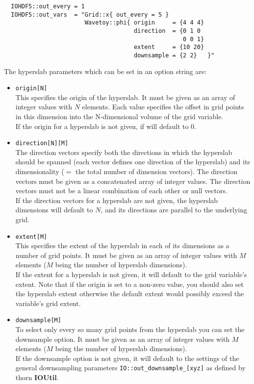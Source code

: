 \documentclass{article}
\begin{document}
\begin{verbatim}
  IOHDF5::out_every = 1
  IOHDF5::out_vars  = "Grid::x{ out_every = 5 }
                       Wavetoy::phi{ origin     = {4 4 4}
                                     direction  = {0 1 0
                                                   0 0 1}
                                     extent     = {10 20}
                                     downsample = {2 2}   }"
\end{verbatim}

The hyperslab parameters which can be set in an option string are:
\begin{itemize}
  \item{\tt origin[N]}\\
    This specifies the origin of the hyperslab. It must be given as an array
    of integer values with $N$ elements. Each value specifies the offset in
    grid points in this dimension into the N-dimensional volume of the grid
    variable.\\
    If the origin for a hyperslab is not given, if will default to 0.
  \item{\tt direction[N][M]}\\
    The direction vectors specify both the directions in which the hyperslab
    should be spanned (each vector defines one direction of the hyperslab)
    and its dimensionality ($=$ the total number of dimension vectors).
    The direction vectors must be given as a concatenated array of integer
    values. The direction vectors must not be a linear combination of each other
    or null vectors.\\
    If the direction vectors for a hyperslab are not given, the hyperslab
    dimensions will default to $N$, and its directions are parallel to the
    underlying grid.
  \item{\tt extent[M]}\\
    This specifies the extent of the hyperslab in each of its dimensions as
    a number of grid points. It must be given as an array of integer values
    with $M$ elements ($M$ being the number of hyperslab dimensions).\\
    If the extent for a hyperslab is not given, it will default to the grid
    variable's extent. Note that if the origin is set to
    a non-zero value, you should also set the hyperslab extent otherwise
    the default extent would possibly exceed the variable's grid extent.
  \item{\tt downsample[M]}\\
    To select only every so many grid points from the hyperslab you can set
    the downsample option. It must be given as an array of integer values
    with $M$ elements ($M$ being the number of hyperslab dimensions).\\
    If the downsample option is not given, it will default to the settings
    of the general downsampling parameters {\tt IO::out\_downsample\_[xyz]} as
    defined by thorn {\bf IOUtil}.
\end{itemize}
\end{document}
